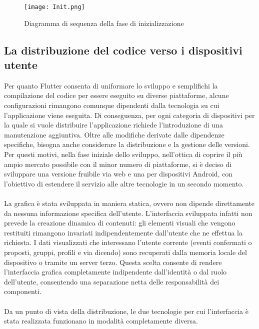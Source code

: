 \begin{figure}[h!]
    \begin{center}
        \texttt{[image: Init.png]}
        \caption{Diagramma di sequenza della fase di inizializzazione }
    \end{center}
\end{figure}


\clearpage

\subsection{La distribuzione del codice verso i dispositivi utente}

Per quanto Flutter consenta di uniformare lo sviluppo e
semplifichi la compilazione del codice per essere eseguito su diverse piattaforme,
alcune configurazioni rimangono comunque dipendenti dalla tecnologia su cui l'applicazione viene eseguita.
Di conseguenza, per ogni categoria di dispositivi per la quale si vuole distribuire l'applicazione 
richiede l'introduzione di una manutenzione aggiuntiva.
Oltre alle modifiche derivate dalle dipendenze specifiche,
bisogna anche considerare la distribuzione e la gestione delle versioni.
Per questi motivi, nella fase iniziale dello sviluppo,
nell'ottica di coprire il più ampio mercato possibile con il minor numero di piattaforme,
si è deciso di sviluppare una versione fruibile via web e una per dispositivi Android,
con l'obiettivo di estendere il servizio alle altre tecnologie in un secondo momento.\\
\\
La grafica è stata sviluppata in maniera statica,
ovvero non dipende direttamente da nessuna informazione specifica dell'utente.
L’interfaccia sviluppata infatti non prevede la creazione dinamica di contenuti:
gli elementi visuali che vengono restituiti rimangono invariati
indipendentemente dall'utente che ne effettua la richiesta.
I dati visualizzati che interessano l'utente corrente
(eventi confermati o proposti, gruppi, profili e via dicendo)
sono recuperati dalla memoria locale del dispositivo o tramite un server terzo.
Questa scelta consente di rendere l'interfaccia grafica completamente
indipendente dall'identità o dal ruolo dell'utente,
consentendo una separazione netta delle responsabilità dei componenti.\\
\\
Da un punto di vista della distribuzione,
le due tecnologie per cui l'interfaccia è stata realizzata funzionano in modalità completamente diversa.
